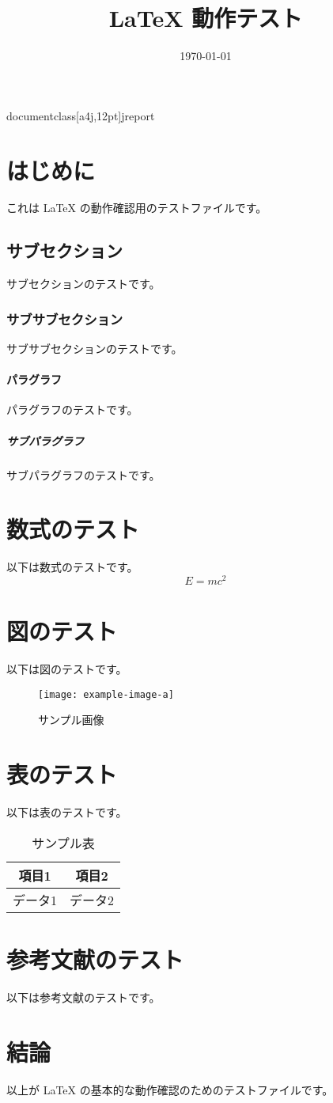 documentclass[a4j,12pt]{jreport}
\title{ {\LaTeX} 動作テスト}
\date{\today}

\maketitle

\section{はじめに}
これは {\LaTeX} の動作確認用のテストファイルです。
\subsection{サブセクション}
サブセクションのテストです。
\subsubsection{サブサブセクション}
サブサブセクションのテストです。
\paragraph{パラグラフ}
パラグラフのテストです。
\subparagraph{サブパラグラフ}
サブパラグラフのテストです。
\section{数式のテスト}
以下は数式のテストです。
\begin{equation}
E = mc^2
\end{equation}
\section{図のテスト}
以下は図のテストです。
\begin{figure}[h]
\centering
\texttt{[image: example-image-a]}
\caption{サンプル画像}
\label{fig:sample}
\end{figure}
\section{表のテスト}
以下は表のテストです。
\begin{table}[h]
\centering
\begin{tabular}{|c|c|}
\hline
項目1 & 項目2 \\
\hline
データ1 & データ2 \\
\hline
\end{tabular}
\caption{サンプル表}
\label{tab:sample}
\end{table}
\section{参考文献のテスト}
以下は参考文献のテストです。


\section{結論}
以上が {\LaTeX} の基本的な動作確認のためのテストファイルです。

\endinput
